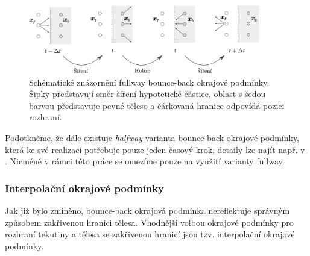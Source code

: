 \begin{figure}[h]
	\centering
	\vspace{2mm}
	\hspace{7mm}
	\includegraphics[width=0.9\textwidth]{Images/bb.pdf}
	\vspace{2.8mm}
	\caption{Schématické znázornění fullway bounce-back okrajové podmínky. Šipky představují směr šíření hypotetické částice, oblast s šedou barvou představuje pevné těleso a čárkovaná hranice odpovídá pozici rozhraní.}
	\label{fig:bb}
	\vspace{1.8mm}
\end{figure}


Podotkněme, že dále existuje \textit{halfway} varianta bounce-back okrajové podmínky, která ke své realizaci potřebuje pouze jeden časový krok, detaily lze najít např. v \cite{Kruger}. Nicméně v rámci této práce se omezíme pouze na využití varianty fullway.
 

\subsubsection{Interpolační okrajové podmínky}\label{interpolation bc}
Jak již bylo zmíněno, bounce-back okrajová podmínka nereflektuje správným způsobem zakřivenou hranici tělesa. Vhodnější volbou okrajové podmínky pro rozhraní tekutiny a tělesa se zakřivenou hranicí jsou tzv. interpolační okrajové podmínky.

